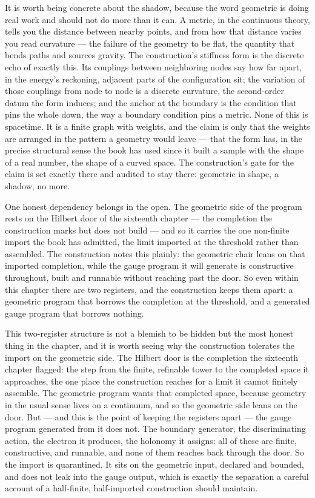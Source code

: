 It is worth being concrete about the shadow, because the word geometric is doing real work and should
not do more than it can. A metric, in the continuous theory, tells you the distance between nearby
points, and from how that distance varies you read curvature --- the failure of the geometry to be flat,
the quantity that bends paths and sources gravity. The construction's stiffness form is the discrete
echo of exactly this. Its couplings between neighboring nodes say how far apart, in the energy's
reckoning, adjacent parts of the configuration sit; the variation of those couplings from node to node
is a discrete curvature, the second-order datum the form induces; and the anchor at the boundary is the
condition that pins the whole down, the way a boundary condition pins a metric. None of this is
spacetime. It is a finite graph with weights, and the claim is only that the weights are arranged in the
pattern a geometry would leave --- that the form has, in the precise structural sense the book has used
since it built a sample with the shape of a real number, the shape of a curved space. The construction's
gate for the claim is set exactly there and audited to stay there: geometric in shape, a shadow, no
more.

One honest dependency belongs in the open. The geometric side of the program rests on the Hilbert door
of the sixteenth chapter --- the completion the construction marks but does not build --- and so it
carries the one non-finite import the book has admitted, the limit imported at the threshold rather than
assembled. The construction notes this plainly: the geometric chair leans on that imported completion,
while the gauge program it will generate is constructive throughout, built and runnable without reaching
past the door. So even within this chapter there are two registers, and the construction keeps them
apart: a geometric program that borrows the completion at the threshold, and a generated gauge program
that borrows nothing.

This two-register structure is not a blemish to be hidden but the most honest thing in the chapter, and
it is worth seeing why the construction tolerates the import on the geometric side. The Hilbert door is
the completion the sixteenth chapter flagged: the step from the finite, refinable tower to the completed
space it approaches, the one place the construction reaches for a limit it cannot finitely assemble. The
geometric program wants that completed space, because geometry in the usual sense lives on a continuum,
and so the geometric side leans on the door. But --- and this is the point of keeping the registers
apart --- the gauge program generated from it does not. The boundary generator, the discriminating
action, the electron it produces, the holonomy it assigns: all of these are finite, constructive, and
runnable, and none of them reaches back through the door. So the import is quarantined. It sits on the
geometric input, declared and bounded, and does not leak into the gauge output, which is exactly the
separation a careful account of a half-finite, half-imported construction should maintain.

